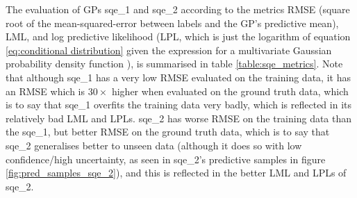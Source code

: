 \documentclass{article}
\begin{document}
The evaluation of GPs sqe\_1 and sqe\_2 according to the metrics RMSE (square root of the mean-squared-error between labels and the GP's predictive mean), LML, and log predictive likelihood (LPL, which is just the logarithm of equation \ref{eq:conditional distribution} given the expression for a multivariate Gaussian probability density function \cite{bishop2006pattern}), is summarised in table \ref{table:sqe_metrics}. Note that although sqe\_1 has a very low RMSE evaluated on the training data, it has an RMSE which is $30\times$ higher when evaluated on the ground truth data, which is to say that sqe\_1 overfits the training data very badly, which is reflected in its relatively bad LML and LPLs. sqe\_2 has worse RMSE on the training data than the sqe\_1, but better RMSE on the ground truth data, which is to say that sqe\_2 generalises better to unseen data (although it does so with low confidence/high uncertainty, as seen in sqe\_2's predictive samples in figure \ref{fig:pred_samples_sqe_2}), and this is reflected in the better LML and LPLs of sqe\_2.
\end{document}
